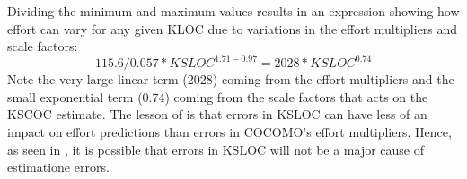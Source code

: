 Dividing the minimum and maximum values results in an  expression showing
how    effort can vary for any given KLOC due to variations in the effort multipliers
and scale factors: 
\begin{equation}\label{eq:ration}
115.6/0.057 *\mathit{KSLOC}^{1.71 - 0.97} = 2028*\mathit{KSLOC}^{0.74}
\end{equation}
Note the very large linear term (2028) coming from the effort multipliers and the
small exponential term (0.74) coming from the scale factors that acts on the KSCOC estimate. The lesson of 
is that errors in KSLOC can have less of an impact on effort predictions than
errors in COCOMO's effort multipliers. Hence, as seen in , it is possible
that errors in KSLOC will not be a major cause of estimatione errors.